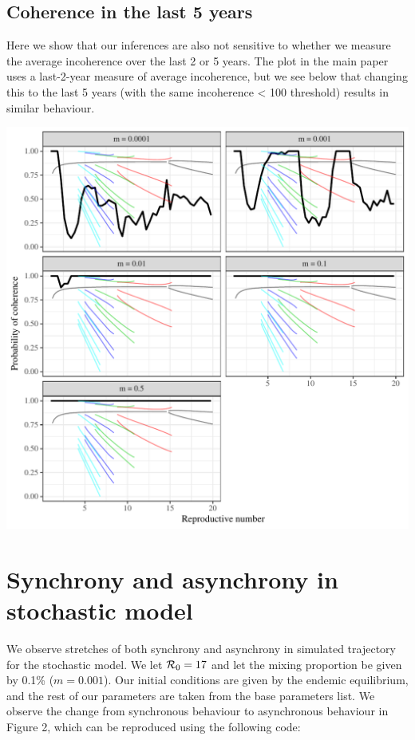 \documentclass[12pt]{article}\usepackage[]{graphicx}\usepackage[]{color}
\makeatletter
\def\maxwidth{ %
  \ifdim\Gin@nat@width>\linewidth
    \linewidth
  \else
    \Gin@nat@width
  \fi
}
\newenvironment{knitrout}{}{} %
\newcommand{\R}{{\cal R}}
\makeatother
\begin{document}
\subsection{Coherence in the last 5 years}
Here we show that our inferences are also not sensitive to whether we measure the average incoherence over the last 2 or 5 years. The plot in the main paper uses a last-2-year measure of average incoherence, but we see below that changing this to the last 5 years (with the same incoherence < 100 threshold) results in similar behaviour.

\begin{knitrout}
\color{fgcolor}
\includegraphics[width=\maxwidth]{figure/coherenceplot-5year-1} 

\end{knitrout}

\section{Synchrony and asynchrony in stochastic model}

We observe stretches of both synchrony and asynchrony in simulated trajectory for the stochastic model. We let $\R_0 = 17$ and let the mixing proportion be given by 0.1\% ($m = 0.001$). Our initial conditions are given by the endemic equilibrium, and the rest of our parameters are taken from the base parameters list. We observe the change from synchronous behaviour to asynchronous behaviour in Figure 2, which can be reproduced using the following code:
\end{document}
